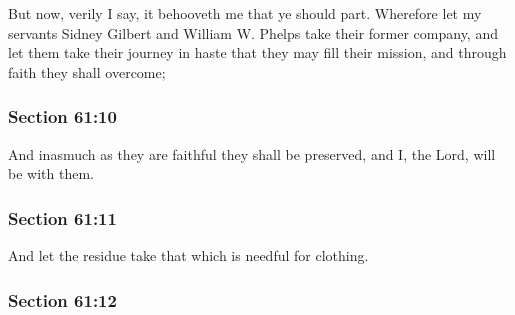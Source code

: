 		But now, verily I say, it behooveth me that ye should part.  Wherefore let my servants Sidney Gilbert and William W. Phelps take their former company, and let them take their journey in haste that they may fill their mission, and through faith they shall overcome;


	\subsubsection{Section 61:10} %
		\label{DC61-10}

		And inasmuch as they are faithful they shall be preserved, and I, the Lord, will be with them.


	\subsubsection{Section 61:11} %
		\label{DC61-11}

		And let the residue take that which is needful for clothing.


	\subsubsection{Section 61:12} %
		\label{DC61-12}

